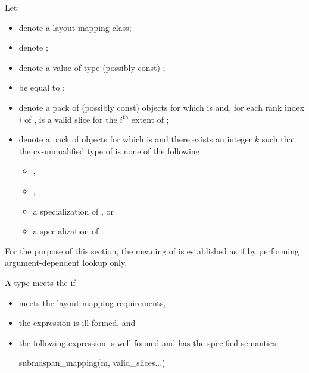 \pnum
Let:
\begin{itemize}
\item
   denote a layout mapping class;
\item
   denote ;
\item
   denote a value of type (possibly const) ;
\item
   be equal to ;
\item
   denote a pack of (possibly const) objects
  for which  is  and,
  for each rank index $i$ of ,
   is a valid  slice
  for the $i^\text{th}$ extent of ;
\item
   denote a pack of objects
  for which  is  and
  there exists an integer $k$ such that the cv-unqualified type
  of  is none of the following:
  \begin{itemize}
  \item {},
  \item {},
  \item a specialization of , or
  \item a specialization of .
  \end{itemize}
\end{itemize}

\pnum
For the purpose of this section,
the meaning of  is established
as if by performing argument-dependent lookup only.

\pnum
A type  meets the  if
\begin{itemize}
\item
{} meets the layout mapping requirements,
\item
the expression  is ill-formed, and
\item
the following expression is well-formed and has the specified semantics:
\begin{codeblock}
submdspan_mapping(m, valid_slices...)
\end{codeblock}
\end{itemize}


